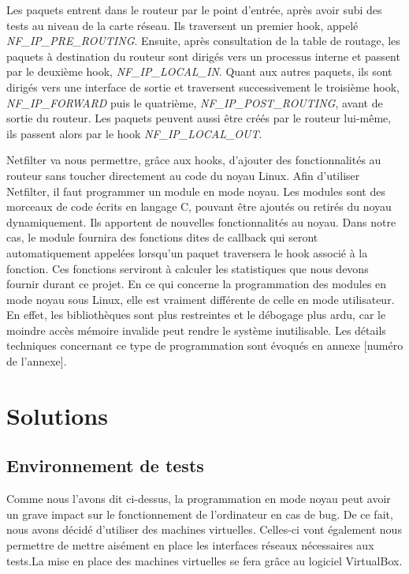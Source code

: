 \documentclass[a4paper]{article}
\begin{document}
Les paquets entrent dans le routeur par le point d'entrée, après avoir 
subi des tests au niveau de la carte réseau. Ils traversent un premier 
hook, appelé \textit{NF\_IP\_PRE\_ROUTING}. Ensuite, après consultation de la table 
de routage, les paquets à destination du routeur sont dirigés vers un 
processus interne et passent par le deuxième hook, \textit{NF\_IP\_LOCAL\_IN}. 
Quant aux autres paquets, ils sont dirigés vers une interface de sortie 
et traversent successivement le troisième hook, \textit{NF\_IP\_FORWARD} puis le 
quatrième, \textit{NF\_IP\_POST\_ROUTING}, avant de sortie du routeur. Les paquets 
peuvent aussi être créés par le routeur lui-même, ils passent alors 
par le hook \textit{NF\_IP\_LOCAL\_OUT}.

Netfilter va nous permettre, grâce aux hooks, d'ajouter des fonctionnalités au routeur 
sans toucher directement au code du noyau Linux. Afin d'utiliser Netfilter, il faut 
programmer un module en mode noyau. Les modules sont des morceaux de code écrits en 
langage C, pouvant être ajoutés ou retirés du noyau dynamiquement. Ils apportent de 
nouvelles fonctionnalités au noyau. Dans notre cas, le module fournira des fonctions 
dites de callback qui seront automatiquement appelées lorsqu'un paquet traversera le 
hook associé à la fonction. Ces fonctions serviront à calculer les statistiques que 
nous devons fournir durant ce projet.
En ce qui concerne la programmation des modules en mode noyau sous Linux, elle est 
vraiment différente de celle en mode utilisateur. En effet, les bibliothèques sont 
plus restreintes et le débogage plus ardu, car le moindre accès mémoire invalide peut 
rendre le système inutilisable. Les détails techniques concernant ce type de programmation 
sont évoqués en annexe [numéro de l'annexe].

\section{Solutions}
\subsection{Environnement de tests}

Comme nous l'avons dit ci-dessus, la programmation en mode noyau peut avoir un grave 
impact sur le fonctionnement de l'ordinateur en cas de bug. De ce fait, nous avons 
décidé d'utiliser des machines virtuelles. Celles-ci vont également nous permettre 
de mettre aisément en place les interfaces réseaux nécessaires aux tests.La mise en 
place des machines virtuelles se fera grâce au logiciel VirtualBox.
\end{document}
